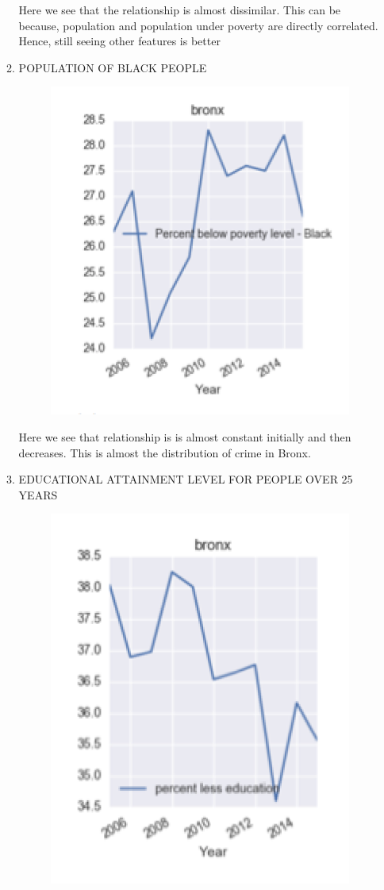 \documentclass{article}
\begin{document}
\begin{itemize}
\begin{enumerate}[label=(\alph*)]
Here we see that the relationship is almost dissimilar. This can be because, population and population under poverty are directly correlated. Hence, still seeing other features is better

\item POPULATION OF BLACK PEOPLE

\begin{figure}[H]
\centering
\includegraphics[scale=1]{BronxBlack.png}
\end{figure}

Here we see that relationship is is almost constant initially and then decreases. This is almost the distribution of crime in Bronx. 

\item EDUCATIONAL ATTAINMENT LEVEL FOR PEOPLE OVER 25 YEARS

\begin{figure}[H]
\centering
\includegraphics[scale=1]{BronxEduc.png}
\end{figure}


\end{enumerate}
\end{itemize}
\end{document}
